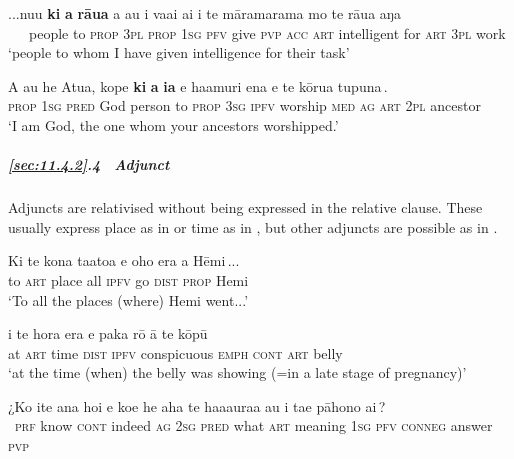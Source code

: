 \ea\label{ex:11.95}
\gll ...nu{\ꞌ}u {\ob}\textbf{ki} \textbf{a} \textbf{rāua} a au i va{\ꞌ}ai ai i te māramarama  mo te rāua aŋa\,{\cb}\\
~~~people {\db}to \textsc{prop} \textsc{3pl} \textsc{prop} \textsc{1sg} \textsc{pfv} give \textsc{pvp} \textsc{acc} \textsc{art} intelligent  for \textsc{art} \textsc{3pl} work\\

\glt 
‘people to whom I have given intelligence for their task’ \textstyleExampleref{[Exo. 28:3]}
\z

\ea\label{ex:11.96}
\gll A au he {\ꞌ}Atua, kope {\ob}\textbf{ki} \textbf{a} \textbf{ia} e ha{\ꞌ}amuri ena e te kōrua tupuna\,{\cb}. \\
\textsc{prop} \textsc{1sg} \textsc{pred} God person {\db}to \textsc{prop} \textsc{3sg} \textsc{ipfv} worship \textsc{med} \textsc{ag} \textsc{art} \textsc{2pl} ancestor \\

\glt 
‘I am God, the one whom your ancestors worshipped.’ \textstyleExampleref{[Mat. 22:32]}
\z

\subparagraph{\ref{sec:11.4.2}.4~ Adjunct} Adjuncts are relativised without being expressed in the relative clause. These usually express place as in  or time as in , but other adjuncts are possible as in .

\ea\label{ex:11.97}
\gll Ki te kona ta{\ꞌ}ato{\ꞌ}a {\ob}e oho era a Hēmi\,{\cb}...\\
to \textsc{art} place all {\db}\textsc{ipfv} go \textsc{dist} \textsc{prop} Hemi\\

\glt 
‘To all the places (where) Hemi went...’ \textstyleExampleref{[R476.004]} 
\z

\ea\label{ex:11.98}
\gll {\ꞌ}i te hora era {\ob}e paka rō {\ꞌ}ā te kōpū\,{\cb} \\
at \textsc{art} time \textsc{dist} {\db}\textsc{ipfv} conspicuous \textsc{emph} \textsc{cont} \textsc{art} belly \\

\glt 
‘at the time (when) the belly was showing (=in a late stage of pregnancy)’ \textstyleExampleref{[R301.004]} 
\z

\ea\label{ex:11.99}
\gll ¿Ko {\ꞌ}ite {\ꞌ}ana ho{\ꞌ}i e koe he aha te ha{\ꞌ}aaura{\ꞌ}a {\ob}au i ta{\ꞌ}e pāhono ai\,{\cb}?\\
~\textsc{prf} know \textsc{cont} indeed \textsc{ag} \textsc{2sg} \textsc{pred} what \textsc{art} meaning  {\db}\textsc{1sg} \textsc{pfv} \textsc{conneg} answer \textsc{pvp}\\

